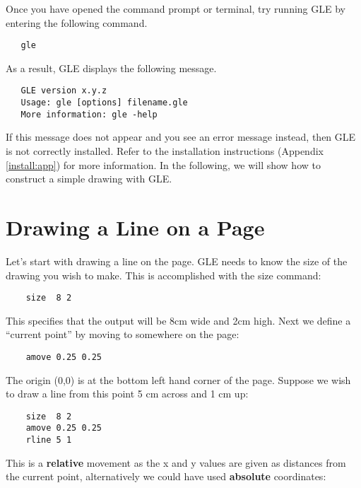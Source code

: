 Once you have opened the command prompt or terminal, try running GLE by entering the following command.

\preglecode{}
\begin{Verbatim}
   gle
\end{Verbatim}
\postglecode{}

As a result, GLE displays the following message.

\preglecode{}
\begin{Verbatim}
   GLE version x.y.z
   Usage: gle [options] filename.gle
   More information: gle -help
\end{Verbatim}
\postglecode{}

If this message does not appear and you see an error message instead, then GLE is not correctly installed. Refer to the installation instructions (Appendix \ref{install:app}) for more information. In the following, we will show how to construct a simple drawing with GLE.

\section{Drawing a Line on a Page}

Let's start with drawing a line on the page. GLE needs to know the size of the drawing you wish to make. This is accomplished with the {\sf size} command:

\preglecode{}
\begin{Verbatim}
    size  8 2
\end{Verbatim}
\postglecode{}

This specifies that the output will be 8cm wide and 2cm high. Next we define a ``current point'' by moving to somewhere on the page:

\preglecode{}
\begin{Verbatim}
    amove 0.25 0.25
\end{Verbatim}
\postglecode{}

The origin (0,0) is at the bottom left hand corner of the page. Suppose we wish to draw a line from this point 5 cm across and 1 cm up:

\preglecode{}
\begin{Verbatim}
    size  8 2
    amove 0.25 0.25
    rline 5 1
\end{Verbatim}
\postglecode{}

This is a {\bf relative} movement as the x and y values are given as distances from the current point, alternatively we could have used {\bf absolute} coordinates:

